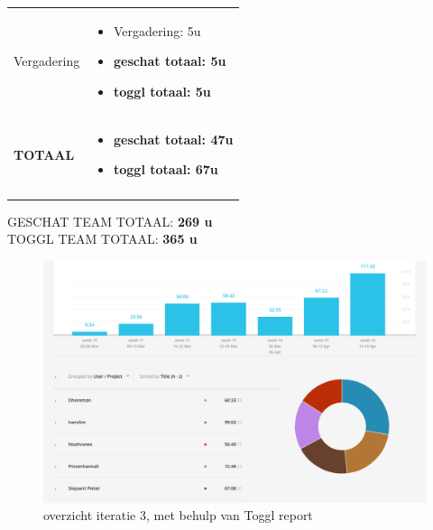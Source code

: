 \documentclass{article}
\begin{document}
\begin{center}
\begin{tabularx}{\textwidth}[t]{XX}
\arrayrulecolor{black}\hline

\vspace{2 mm}
Vergadering & 
\begin{minipage}[t]{\linewidth}%
\vspace{2 mm}
\begin{itemize}
\item Vergadering: 5u
\item \textbf{geschat totaal: 5u}
\item \textbf{toggl totaal: 5u}
\vspace{2 mm}
\end{itemize} 
\end{minipage}\\

\arrayrulecolor{black}\hline

\vspace{2 mm}
\textbf{TOTAAL} & 
\begin{minipage}[t]{\linewidth}%
\vspace{2 mm}
\begin{itemize}
\item \textbf{geschat totaal: 47u}
\item \textbf{toggl totaal: 67u}
\vspace{2 mm}
\end{itemize} 
\end{minipage}\\

\arrayrulecolor{black}\hline

\end{tabularx}
\end{center}

\vspace{4 mm}
\noindent \large{GESCHAT TEAM TOTAAL: \textbf{269 u}}\\
\large{TOGGL TEAM TOTAAL:  \textbf{365 u}}\\


\begin{figure}[h!]
\centering
 \centerline{\includegraphics[width=160mm]{Toggl_screenshot_iteratie3.pdf}}
 \label{toggl_iteratie3}
 \caption{overzicht iteratie 3, met behulp van Toggl report}
\end{figure}
\end{document}
